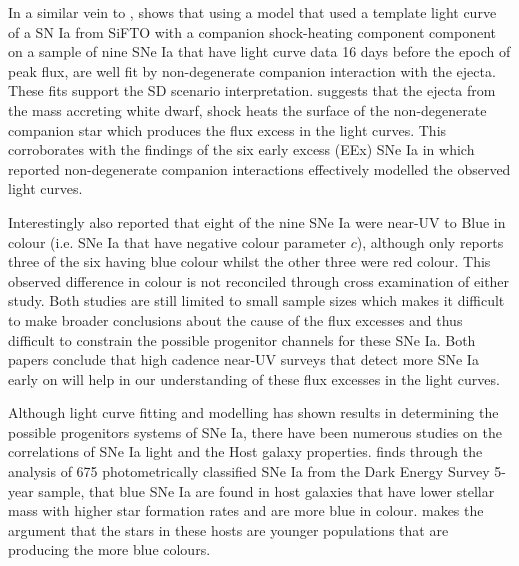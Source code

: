 In a similar vein to \textcite{deckers_constraining_2022}, \textcite{burke_early_2022} shows that using a model that used a template light curve of a SN Ia from SiFTO with a companion shock-heating component component on a sample of nine SNe Ia that have light curve data 16 days before the epoch of peak flux, are well fit by non-degenerate companion interaction with the ejecta. These fits support the SD scenario interpretation. \textcite{burke_early_2022} suggests that the ejecta from the mass accreting white dwarf, shock heats the surface of the non-degenerate companion star which produces the flux excess in the light curves. This corroborates with the findings of the six early excess (EEx) SNe Ia in \textcite{deckers_constraining_2022} which reported non-degenerate companion interactions effectively modelled the observed light curves. 

Interestingly \textcite{burke_early_2022} also reported that eight of the nine SNe Ia were near-UV to Blue in colour (i.e. SNe Ia that have negative colour parameter $c$), although \textcite{deckers_constraining_2022} only reports three of the six having blue colour whilst the other three were red colour. This observed difference in colour is not reconciled through cross examination of either study. Both studies are still limited to small sample sizes which makes it difficult to make broader conclusions about the cause of the flux excesses and thus difficult to constrain the possible progenitor channels for these SNe Ia. Both papers conclude that high cadence near-UV surveys that detect more SNe Ia early on will help in our understanding of these flux excesses in the light curves. 

Although light curve fitting and modelling has shown results in determining the possible progenitors systems of SNe Ia, there have been numerous studies on the correlations of SNe Ia light and the Host galaxy properties. \textcite{kelsey_concerning_2022} finds through the analysis of 675 photometrically classified SNe Ia from the Dark Energy Survey 5-year sample, that blue SNe Ia are found in host galaxies that have lower stellar mass with higher star formation rates and are more blue in colour. \textcite{kelsey_concerning_2022} makes the argument that the stars in these hosts are younger populations that are producing the more blue colours. 

